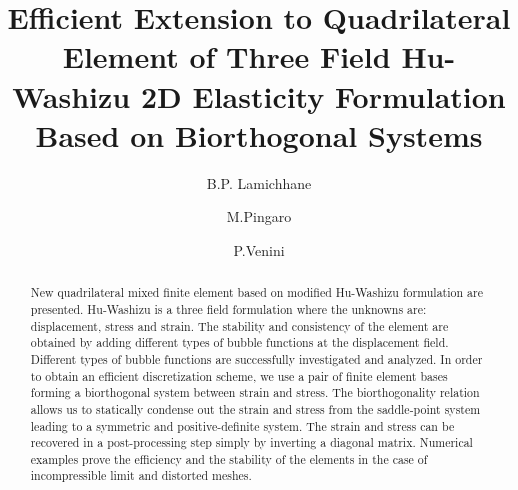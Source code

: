 \documentclass[preprint,12pt,authoryear]{elsarticle}
\begin{document}
\begin{frontmatter}




\title{Efficient Extension to Quadrilateral Element of Three 
Field Hu-Washizu 2D Elasticity Formulation Based on Biorthogonal Systems}

	

\author{B.P. Lamichhane}
\author{M.Pingaro}
\author{P.Venini}

%


\begin{abstract}
New quadrilateral mixed finite element based on modified Hu-Washizu formulation are presented.
Hu-Washizu is a three field formulation where the unknowns are: displacement, stress and strain.
The stability and consistency of the element are obtained by adding different types of bubble functions at the displacement field. Different types of bubble functions are successfully investigated and analyzed. 
In order to obtain an efficient discretization scheme, we use a pair of finite element bases forming a biorthogonal system between strain and stress. 
The biorthogonality relation allows us to statically condense out the strain and stress from the saddle-point system leading to a symmetric and positive-definite system. 
The strain and stress can be recovered in a post-processing step simply by inverting a diagonal matrix.
Numerical examples prove the efficiency and the stability of the elements in the case of incompressible limit and distorted meshes.
\end{abstract}


\end{frontmatter}
\end{document}
